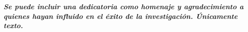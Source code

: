 \vspace*{1.5in}
\begin{flushright}
		\begin{minipage}[b]{5in}
				\Large\bfseries\emph{Se puede incluir una dedicatoria como homenaje y agradecimiento a quienes hayan influido en el éxito de la investigación. Únicamente texto. }
		\end{minipage}
\end{flushright}

